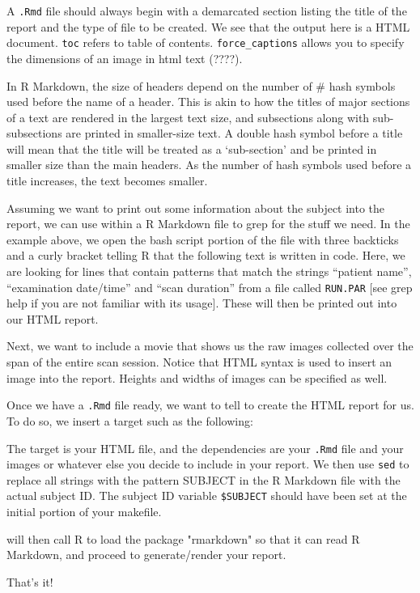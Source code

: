 A \texttt{.Rmd} file should always begin with a demarcated section listing the title of the report and the type of file to be created. We see that the output here is a HTML document. \texttt{toc} refers to table of contents. \texttt{force_captions} allows you to specify the dimensions of an image in html text (????). 

In R Markdown, the size of headers depend on the number of \# hash symbols used before the name of a header. This is akin to how the titles of major sections of a text are rendered in the largest text size, and subsections along with sub-subsections are printed in smaller-size text. A double hash symbol before a title will mean that the title will be treated as a `sub-section' and be printed in smaller size than the main headers. As the number of hash symbols used before a title increases, the text becomes smaller.


Assuming we want to print out some information about the subject into the report, we can use \bashn{} within a R Markdown file to grep for the stuff we need. In the example above, we open the bash script portion of the file with three backticks and a curly bracket telling R that the following text is written in \bashn{} code. Here, we are looking for lines that contain patterns that match the strings ``patient name'', ``examination date/time'' and ``scan duration'' from a file called \texttt{RUN.PAR} [see grep help if you are not familiar with its usage]. These will then be printed out into our HTML report.

Next, we want to include a movie that shows us the raw images collected over the span of the entire scan session. Notice that HTML syntax is used to insert an image into the report. Heights and widths of images can be specified as well. 

Once we have a \texttt{.Rmd} file ready, we want to tell \maken{} to create the HTML report for us. To do so, we insert a target such as the following:

The target is your HTML file, and the dependencies are your \texttt{.Rmd} file and your images or whatever else you decide to include in your report. We then use \texttt{sed} to replace all strings with the pattern SUBJECT in the R Markdown file with the actual subject ID. The subject ID variable \texttt{\$SUBJECT} should have been set at the initial portion of your makefile. 

\maken{} will then call R to load the package "rmarkdown" so that it can read R Markdown, and proceed to generate/render your report.

That's it! 













